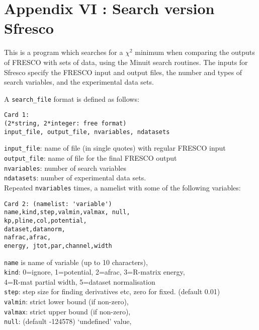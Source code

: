 \documentclass[11pt]{article}
\begin{document}
%
\newpage
\section*{Appendix VI : Search version {\sc Sfresco}}

This is a program which searches for a $\chi^2$ minimum when comparing
the outputs of FRESCO with sets of data, using the {\sc Minuit} search
routines.
%
The inputs for {\sc Sfresco} specify the FRESCO input and output files,
the number and types of search variables, and the experimental data sets.

A {\tt search\_file} format is defined as follows:
\begin{verbatim}
Card 1:
(2*string, 2*integer: free format)
input_file, output_file, nvariables, ndatasets
\end{verbatim}
\smallskip

{\tt input\_file}: name of file (in single quotes) with regular FRESCO input\\
{\tt output\_file}: name of file for the final FRESCO output\\
{\tt nvariables}: number of search variables\\
{\tt ndatasets}:  number of experimental data sets.\\

Repeated {\tt nvariables} times, a namelist with some of the following variables:
\begin{verbatim}
Card 2: (namelist: 'variable')
name,kind,step,valmin,valmax, null,
kp,pline,col,potential,
dataset,datanorm,
nafrac,afrac,
energy, jtot,par,channel,width
\end{verbatim}
{\tt name} is name of variable (up to 10 characters),\\
{\tt kind}: 0=ignore, 1=potential, 2=afrac, 3=R-matrix energy,\\
   \hspace*{10mm} 4=R-mat partial width, 5=dataset normalisation\\
{\tt step}: step size for finding derivatives etc, zero for fixed. (default 0.01)\\
{\tt valmin}: strict lower bound (if non-zero),\\
{\tt valmax}: strict upper bound (if non-zero), \\
{\tt null}: (default -124578) `undefined' value,\\
\end{document}
